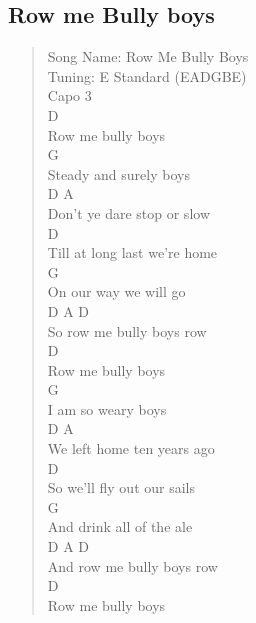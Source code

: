 \documentclass[11pt]{article}
\begin{document}
\subsection{Row me Bully boys}
\label{sec:orge29cff7}
\begin{verse}
Song Name:   Row Me Bully Boys\\
Tuning: E Standard (EADGBE)\\
\vspace*{1em}
Capo 3\\
\vspace*{1em}
D\\
Row me bully boys\\
G\\
Steady and surely boys\\
D                     A\\
Don't ye dare stop﻿ or slow\\
\hspace*{8em}D\\
Till at long last we're home\\
\hspace*{7em}G\\
On our way we will go\\
\hspace*{3em}D      A          D\\
So row me bully boys row\\
\vspace*{1em}
\vspace*{1em}
D\\
Row me bully boys\\
G\\
I am so weary boys\\
D                       A\\
We left home ten years ago\\
\hspace*{9em}D\\
So we'll fly out our sails\\
\hspace*{10em}G\\
And drink all of the ale\\
\hspace*{4em}D      A          D\\
And row me﻿ bully boys row\\
\vspace*{1em}
\vspace*{1em}
D\\
Row me﻿ bully boys\\

\end{verse}
\end{document}

